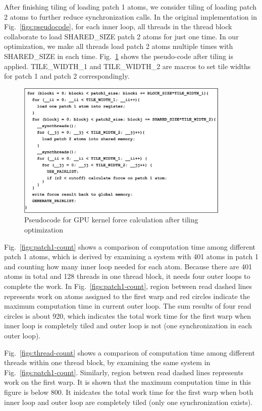 After finishing tiling of loading patch 1 atoms, we consider tiling of loading patch 2 atoms to further reduce synchronization calls.
In the original implementation in Fig.~\ref{figs:pseudocode}, for each inner loop, all threads in the thread block collaborate to load SHARED\_SIZE
patch 2 atoms for just one time.
In our optimization, we make all threads load patch 2 atoms multiple times with SHARED\_SIZE in each time. Fig.~\ref{figs:pseudocode-tile} shows
the pseudo-code after tiling is applied. TILE\_WIDTH\_1 and TILE\_WIDTH\_2 are macros to set tile widths for patch 1 and patch 2 correspondingly.

\begin{figure}[h]
\centering
\setlength{\abovecaptionskip}{-1pt}
\setlength{\belowcaptionskip}{-2pt}
\includegraphics[width=4.0in]{figs/pseudocode-tile-eps-converted-to}
\caption{Pseudocode for GPU kernel force calculation after tiling optimization}
\label{figs:pseudocode-tile}
\end{figure}

Fig.~\ref{figs:patch1-count} shows a comparison of computation time among different patch 1 atoms, which is derived by examining a system with 401 atoms in patch 1
and counting how many inner loop needed for each atom. Because there are 401 atoms in total and 128 threads in one thread block, it needs four outer loops to
complete the work. In Fig.~\ref{figs:patch1-count}, region between read dashed lines represents work on atoms assigned to the first
warp and red circles indicate the maximum computation time in current outer loop. The sum results of four read circles is about 920, which indicates
the total work time for the first warp when inner loop is completely tiled and outer loop is not (one synchronization in each outer loop).

Fig.~\ref{figs:thread-count} shows a comparison of computation time among different threads within one thread block, by examining the same system
in Fig.~\ref{figs:patch1-count}. Similarly, region betwen read dashed lines represents work on the first warp. It is shown that the maximum computation time
in this figure is below 800. It inidcates the total work time for the first warp when both inner loop and outer loop are completely tiled (only one synchronization exists). 

